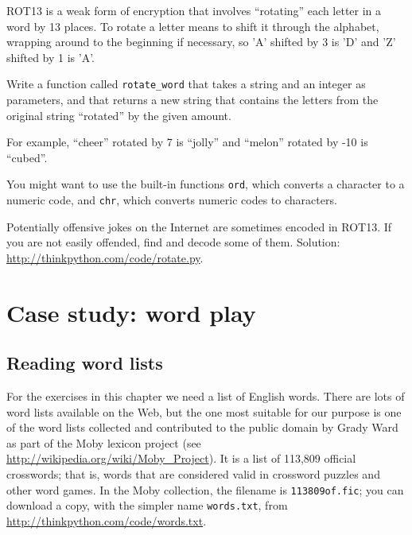 \documentclass[10pt]{book}
\begin{document}
\begin{exercise}

\label{exrotate}
ROT13 is a weak form of encryption that involves ``rotating'' each
letter in a word by 13 places.  To rotate a letter means
to shift it through the alphabet, wrapping around to the beginning if
necessary, so 'A' shifted by 3 is 'D' and 'Z' shifted by 1 is 'A'.

Write a function called \verb"rotate_word"
that takes a string and an integer as parameters, and that returns
a new string that contains the letters from the original string
``rotated'' by the given amount.

For example, ``cheer'' rotated by 7 is ``jolly'' and ``melon'' rotated
by -10 is ``cubed''.


You might want to use the built-in functions {\tt ord}, which converts
a character to a numeric code, and {\tt chr}, which converts numeric
codes to characters.

Potentially offensive jokes on the Internet are sometimes encoded
in ROT13.  If you are not easily offended, find and decode some
of them.  Solution: \url{http://thinkpython.com/code/rotate.py}.

\end{exercise}


\chapter{Case study: word play}

\section{Reading word lists}
\label{wordlist}

For the exercises in this chapter we need a list of English words.
There are lots of word lists available on the Web, but the one most
suitable for our purpose is one of the word lists collected and
contributed to the public domain by Grady Ward as part of the Moby
lexicon project (see \url{http://wikipedia.org/wiki/Moby_Project}).  It
is a list of 113,809 official crosswords; that is, words that are
considered valid in crossword puzzles and other word games.  In the
Moby collection, the filename is {\tt 113809of.fic}; you can download
a copy, with the simpler name {\tt words.txt}, from
\url{http://thinkpython.com/code/words.txt}.
\end{document}
